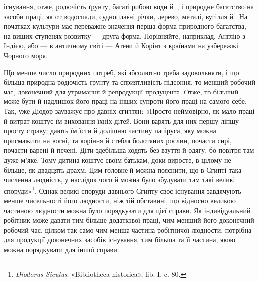 \parcont{}  %
існування, отже, родючість ґрунту, багаті рибою води й~,
і природне багатство на засоби праці, як от водоспади, судноплавні
річки, дерево, металі, вугілля й~ На початках культури
має переважне значення перша форма природного багатства,
на вищих ступенях розвитку — друга форма. Порівняйте,
наприклад, Англію з Індією, або — в античному світі — Атени
й Корінт з країнами на узбережжі Чорного моря.

Що менше число природних потреб, які абсолютно треба
задовольняти, і що більша природна родючість ґрунту та сприятливість
підсоння, то менший робочий час, доконечний для утримання
й репродукції продуцента. Отже, то більший може бути й
надлишок його праці на інших супроти його праці на самого себе.
Так, уже Діодор зауважує про давніх єгиптян: «Просто неймовірно,
як мало праці й витрат коштує їм виховання їхніх дітей.
Вони варять для них першу-ліпшу просту страву; дають їм
їсти й долішню частину папіруса, яку можна присмажити на
вогні, та коріння й стебла болотяних рослин, почасти сирі, почасти
варені й печені. Діти здебільша ходять без взуття й одягу,
бо повітря там дуже м’яке. Тому дитина коштує своїм батькам,
доки виросте, в цілому не більше, як двадцять драхм. Цим головне
й можна пояснити, що в Єгипті така численна людність,
у наслідок чого й можна було збудувати там такі великі споруди»\footnote{
\emph{Diodorus Siculus}: «Bibliotheca historica», lib. I, c. 80.
}.
Однак великі споруди давнього Єгипту своє існування
завдячують менше чисельності його людности, ніж тій обставині,
що відносно великою частиною людности можна було порядкувати
для цієї справи. Як індивідуальний робітник може давати
тим більше додаткової праці, чим менший його доконечний робочий
час, цілком так само чим менша частина робітничої людности,
потрібна для продукції доконечних засобів існування,
тим більша та її частина, якою можна порядкувати для іншої
справи.

